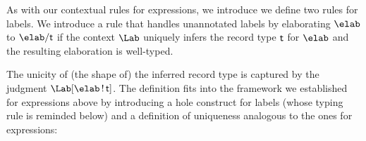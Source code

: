 \documentclass[acmsmall,screen,nonacm,review]{acmart}
\begin{document}
\begin{version}{}
As with our contextual rules for expressions, we introduce we define two
rules for labels.  We introduce a rule  that handles unannotated
labels by elaborating $\elab$ to $\elab / \T$ if the context $\Lab$ uniquely
infers the record type $\mathopen{}\mathrel{\mathsf{t}}$ for $\elab$ and the resulting elaboration is
well-typed.

The unicity of (the shape of) the inferred record type is captured by the
judgment $\Lshape \Lab \elab \T$. The definition fits into the framework we
established for expressions above by introducing a hole construct for labels
(whose typing rule  is reminded below) and a definition of
uniqueness analogous to the ones for expressions:
\end{version}



\end{document}

